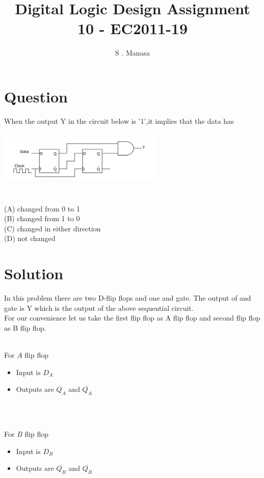 \documentclass{article}
\title{Digital Logic Design Assignment 10 - EC2011-19}
\author{S . Manasa}
\begin{document}
\maketitle

\section{Question}
When the output Y in the circuit below is '1',it implies that the data has
\begin{center}
\includegraphics[width=300,height=100]{Figure.jpeg}
\end{center}
\\
(A) changed from 0 to 1\\
(B) changed from 1 to 0\\
(C) changed in either direction\\
(D) not changed\\


\section{Solution}
In this problem there are two D-flip flops and one and gate.
The output of and gate is Y which is the output of the above sequential circuit.\\ For our convenience let us take the first flip flop as A flip flop and second flip flop as B flip flop.\\~


For $A$ flip flop
\begin{itemize}
    \item Input is $D_A$
    \item Outputs are $Q_A$ and $\overline{Q_A}$
\end{itemize}
\\~

For $B$ flip flop
\begin{itemize}
    \item Input is $D_B$
    \item Outputs are $Q_B$ and $\overline{Q_B}$
\end{itemize}
 \\~
 
\end{document}
